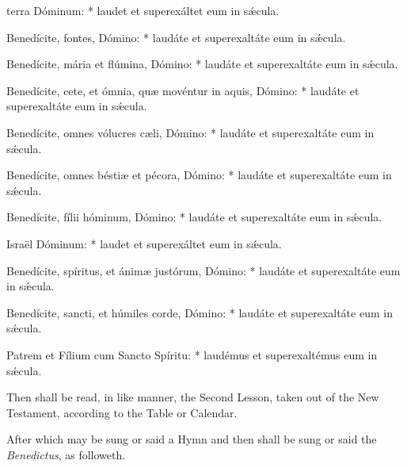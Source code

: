 { terra Dóminum: * laudet et superexáltet eum in sǽcula.\par
{}
Benedícite, fontes, Dómino: * laudáte et superexaltáte eum in sǽcula.\par
Benedícite, mária et flúmina, Dómino: * laudáte et superexaltáte eum in sǽcula.\par
Benedícite, cete, et ómnia, qu{\ae} movéntur in aquis, Dómino: * laudáte et superexaltáte eum in sǽcula.\par
Benedícite, omnes vólucres c{\ae}li, Dómino: * laudáte et superexaltáte eum in sǽcula.\par
Benedícite, omnes bésti{\ae} et pécora, Dómino: * laudáte et superexaltáte eum in sǽcula.\par
Benedícite, fílii hóminum, Dómino: * laudáte et superexaltáte eum in sǽcula.\par
{} Israël Dóminum: * laudet et superexáltet eum in sǽcula.\par
{}
Benedícite, spíritus, et ánim{\ae} justórum, Dómino: * laudáte et superexaltáte eum in sǽcula.\par
Benedícite, sancti, et húmiles corde, Dómino: * laudáte et superexaltáte eum in sǽcula.\par
{} Patrem et Fílium cum Sancto Spíritu: * laudémus et superexaltémus eum in sǽcula.}
\begin{rubric}
    {Then shall be read, in like manner, the Second Lesson, taken out of the New Testament, according to the Table or Calendar.}
\end{rubric}

\label{Benedictus}

\vspace{-2ex}

\begin{rubric}
    After which may be sung or said a Hymn and then shall be sung or said the \emph{Benedictus}, as followeth.
\end{rubric}

